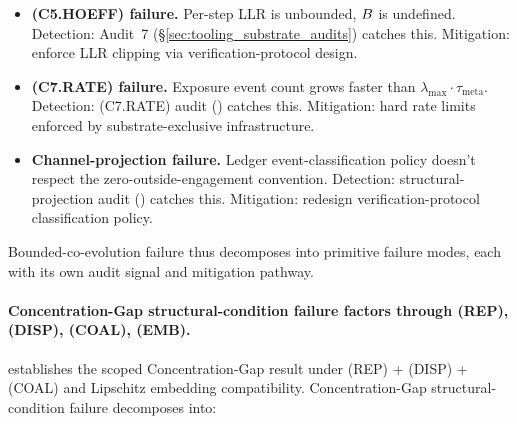 \begin{itemize}
\item \textbf{(C5.HOEFF) failure.}  Per-step LLR is unbounded,
  $B$ is undefined.  Detection: Audit~7
  (\S\ref{sec:tooling_substrate_audits}) catches this.  Mitigation:
  enforce LLR clipping via verification-protocol design.
\item \textbf{(C7.RATE) failure.}  Exposure event count grows
  faster than $\lambda_{\max} \cdot \tau_{\mathrm{meta}}$.
  Detection: (C7.RATE) audit
  (\citep[\S 6]{lasser2026foundations}) catches this.  Mitigation:
  hard rate limits enforced by substrate-exclusive infrastructure.
\item \textbf{Channel-projection failure.}  Ledger event-classification
  policy doesn't respect the zero-outside-engagement convention.
  Detection: structural-projection audit
  (\citep[\S 6]{lasser2026foundations}) catches this.  Mitigation:
  redesign verification-protocol classification policy.
\end{itemize}

Bounded-co-evolution failure thus decomposes into primitive
failure modes, each with its own audit signal and mitigation
pathway.

\paragraph{Concentration-Gap structural-condition failure factors through (REP), (DISP), (COAL), (EMB).}
\citep[Theorem~2]{lasser2026foundations} establishes the scoped
Concentration-Gap result under (REP) + (DISP) + (COAL) and
Lipschitz embedding compatibility. Concentration-Gap
structural-condition failure decomposes into:

